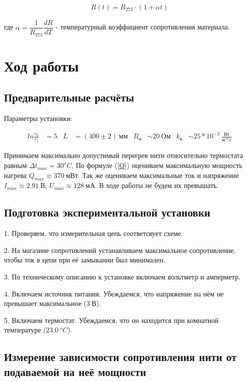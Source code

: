 \documentclass[a4paper, 12pt]{article}
\begin{document}
        \begin{align}
            R(t) = R_{273} \cdot (1 + \alpha t) \label{RT}
        \end{align}

        где $\alpha = \dfrac{1}{R_{273}} \dfrac{dR}{dT}$ - температурный коэффициент сопротивления материала.

    \section{Ход работы}

        \subsection{Предварительные расчёты}

            Параметры установки:

            \begin{align*}
                ln \frac{r_0}{r_1} &= 5 & L &= (400 \pm 2)~мм & R_н &\sim 20~Ом & k_в &\sim 25 * 10^{-3}~\frac{Вт}{м*с}
            \end{align*}

            Принимаем максимально допустимый перегрев нити относительно термостата равным $\Delta t_{max} = 30^oC$. По формуле (\ref{Q}) оцениваем максимальную мощность нагрева $Q_{max} \approx 370~мВт$. Так же оцениваем максимальные ток и напряжение $I_{max} \approx 2.91~В$; $U_{max} \approx 128~мА$. В ходе работы не будем их превышать.

        \subsection{Подготовка экспериментальной установки}

            1. Проверяем, что измерительная цепь соответсвует схеме.

            2. На магазине сопротивлений устанавливаем максимальное сопротивление, чтобы ток в цепи при её замыкании был минимален.

            3. По техническому описанию к установке включаем вольтметр и амперметр.

            4. Включаем источник питания. Убеждаемся, что напряжение на нём не превышает максимальное ($3~В$).

            5. Включаем термостат. Убеждаемся, что он находится при комнатной температуре ($23.0~^oC$).

        \subsection{Измерение зависимости сопротивления нити от подаваемой на неё мощности}
\end{document}
